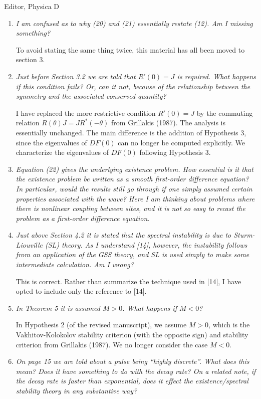 \documentclass[11pt]{letter}
\begin{document}
\begin{letter}{Editor, Physica D}
\begin{enumerate}
\item \emph{I am confused as to why (20) and (21) essentially restate (12). Am I missing something?}

To avoid stating the same thing twice, this material has all been moved to section 3. 

\item \emph{Just before Section 3.2 we are told that $R'(0) = J$ is required. What happens if this condition fails? Or, can it not, because of the relationship between the symmetry and the associated conserved quantity?}

I have replaced the more restrictive condition $R'(0) = J$ by the commuting relation $R(\theta) J = J R^*(-\theta)$ from Grillakis (1987). The analysis is essentially unchanged. The main difference is the addition of Hypothesis 3, since the eigenvalues of $DF(0)$ can no longer be computed explicitly. We characterize the eigenvalues of $DF(0)$ following Hypothesis 3.

\item \emph{Equation (22) gives the underlying existence problem. How essential is it that the existence problem be written as a smooth first-order difference equation? In particular, would the results still go through if one simply assumed certain properties associated with the wave? Here I am thinking about problems where there is nonlinear coupling between sites, and it is not so easy to recast the problem as a first-order difference equation.}

\item \emph{Just above Section 4.2 it is stated that the spectral instability is due to Sturm-Liouville (SL) theory. As I understand [14], however, the instability follows from an application of the GSS theory, and SL is used simply to make some intermediate calculation. Am I wrong?}

This is correct. Rather than summarize the technique used in [14], I have opted to include only the reference to [14].

\item \emph{In Theorem 5 it is assumed $M > 0$. What happens if $M < 0$?}

In Hypothesis 2 (of the revised manuscript), we assume $M > 0$, which is the Vakhitov-Kolokolov stability criterion (with the opposite sign) and stability criterion from Grillakis (1987). We no longer consider the case $M < 0$.

\item \emph{On page 15 we are told about a pulse being ``highly discrete''. What does this mean? Does it have something to do with the decay rate? On a related note, if the decay rate is faster than exponential, does it effect the existence/spectral stability theory in any substantive way?}


\end{enumerate}
\end{letter}
\end{document}
